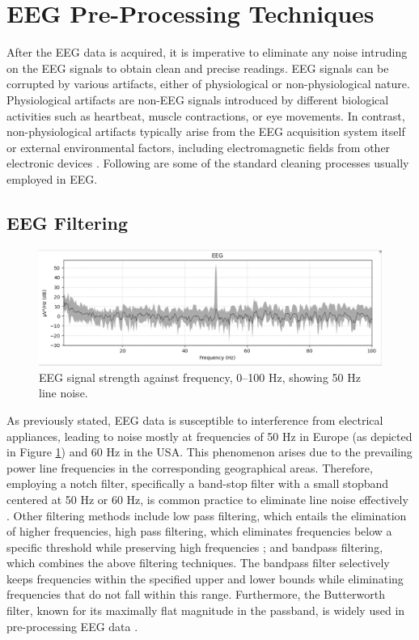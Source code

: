 \section{EEG Pre-Processing Techniques}
\label{sec:Background:Common EEG Artifacts}

After the EEG data is acquired, it is imperative to eliminate any noise intruding on the EEG signals to obtain clean and precise readings.
EEG signals can be corrupted by various artifacts, either of physiological or non-physiological nature. Physiological artifacts are non-EEG signals introduced by different biological activities such as heartbeat, muscle contractions, or eye movements. In contrast, non-physiological artifacts typically arise from the EEG acquisition system itself or external environmental factors, including electromagnetic fields from other electronic devices \cite{survey_brain_biometrics}. Following are some of the standard cleaning processes usually employed in EEG.   
\subsection{EEG Filtering}

\begin{figure}
    \centering
    \includegraphics[width=\textwidth]{figures/background_psd_plot.png}  
    \caption{EEG signal strength against frequency, 0–100 Hz, showing 50 Hz line noise.}
    \label{fig: PSD of line noise}
\end{figure}

As previously stated, EEG data is susceptible to interference from electrical appliances, leading to noise mostly at frequencies of 50 Hz in Europe (as depicted in Figure \ref{fig: PSD of line noise}) and 60 Hz in the USA. This phenomenon arises due to the prevailing power line frequencies in the corresponding geographical areas. Therefore, employing a notch filter, specifically a band-stop filter with a small stopband centered at 50 Hz or 60 Hz, is common practice to eliminate line noise effectively \cite{delorme2023eeg}. Other filtering methods include low pass filtering, which entails the elimination of higher frequencies, high pass filtering, which eliminates frequencies below a specific threshold while preserving high frequencies \cite{gonccales2021effects}; and bandpass filtering, which combines the above filtering techniques. 
The bandpass filter selectively keeps frequencies within the specified upper and lower bounds while eliminating frequencies that do not fall within this range. Furthermore, the Butterworth filter, known for its maximally flat magnitude in the passband, is widely used in pre-processing EEG data \cite{survey_brain_biometrics}.       
